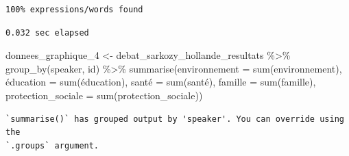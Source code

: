 \documentclass[
  letterpaper,
  DIV=11,
  numbers=noendperiod]{scrartcl}
\newenvironment{Shaded}{\begin{snugshade}}{\end{snugshade}}
\newcommand{\AttributeTok}[1]{\textcolor[rgb]{0.40,0.45,0.13}{#1}}
\newcommand{\FunctionTok}[1]{\textcolor[rgb]{0.28,0.35,0.67}{#1}}
\newcommand{\NormalTok}[1]{\textcolor[rgb]{0.00,0.23,0.31}{#1}}
\newcommand{\OtherTok}[1]{\textcolor[rgb]{0.00,0.23,0.31}{#1}}
\newcommand{\SpecialCharTok}[1]{\textcolor[rgb]{0.37,0.37,0.37}{#1}}
\begin{document}
\begin{verbatim}
100% expressions/words found
\end{verbatim}

\begin{verbatim}
0.032 sec elapsed
\end{verbatim}

\begin{Shaded}
\begin{Highlighting}[]
\NormalTok{donnees\_graphique\_4 }\OtherTok{\textless{}{-}}\NormalTok{ debat\_sarkozy\_hollande\_resultats }\SpecialCharTok{\%\textgreater{}\%} \FunctionTok{group\_by}\NormalTok{(speaker, id) }\SpecialCharTok{\%\textgreater{}\%} \FunctionTok{summarise}\NormalTok{(}\AttributeTok{environnement =} \FunctionTok{sum}\NormalTok{(environnement), é}\AttributeTok{ducation =} \FunctionTok{sum}\NormalTok{(éducation), santé }\OtherTok{=} \FunctionTok{sum}\NormalTok{(santé), }\AttributeTok{famille =} \FunctionTok{sum}\NormalTok{(famille), }\AttributeTok{protection\_sociale =} \FunctionTok{sum}\NormalTok{(protection\_sociale))}
\end{Highlighting}
\end{Shaded}

\begin{verbatim}
`summarise()` has grouped output by 'speaker'. You can override using the
`.groups` argument.
\end{verbatim}
\end{document}
